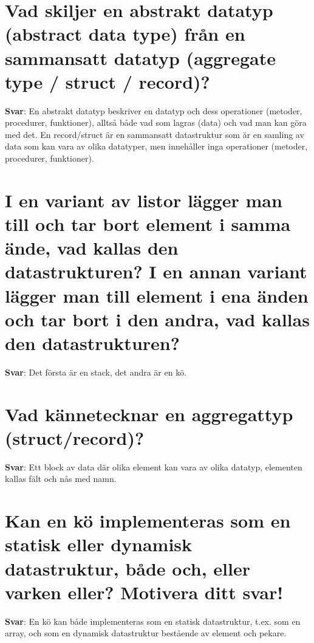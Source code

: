 \documentclass[a4paper,11pt,oneside]{book}
\begin{document}
\begin{sloppypar}
\section{Vad skiljer en abstrakt datatyp (abstract data type) fr\r{a}n en sammansatt datatyp (aggregate type / struct / record)?}

\label{q:265:sa:sv:True}

\textbf{Svar}: En abstrakt datatyp beskriver en datatyp och dess operationer (metoder, procedurer, funktioner), allts\r{a} b\r{a}de vad som lagras (data) och vad man kan g\"ora med det. En record/struct \"ar en sammansatt datastruktur som \"ar en samling av data som kan vara av olika datatyper, men inneh\r{a}ller inga operationer (metoder, procedurer, funktioner).



\section{I en variant av listor l\"agger man till och tar bort element i samma \"ande, vad kallas den datastrukturen? I en annan variant l\"agger man till element i ena \"anden och tar bort i den andra, vad kallas den datastrukturen?}

\label{q:266:sa:sv:True}

\textbf{Svar}: Det f\"orsta \"ar en stack, det andra \"ar en k\"o.



\section{Vad k\"annetecknar en aggregattyp (struct/record)?}

\label{q:267:sa:sv:True}

\textbf{Svar}: Ett block av data d\"ar olika element kan vara av olika datatyp, elementen kallas f\"alt och n\r{a}s med namn.



\section{Kan en k\"o implementeras som en statisk eller dynamisk datastruktur, b\r{a}de och, eller varken eller? Motivera ditt svar!}

\label{q:268:sa:sv:True}

\textbf{Svar}: En k\"o kan b\r{a}de implementeras som en statisk datastruktur, t.ex. som en array, och som en dynamisk datastruktur best\r{a}ende av element och pekare.




\end{sloppypar}
\end{document}
